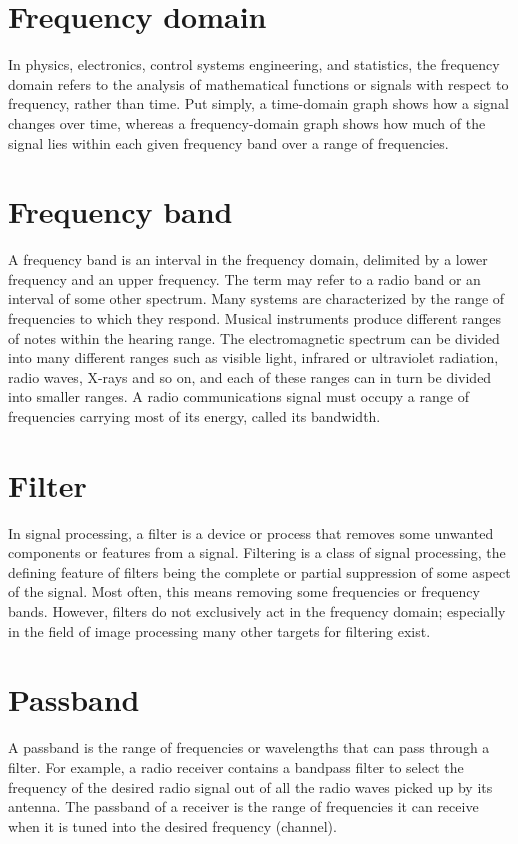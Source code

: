 \documentclass[journal,compsoc]{IEEEtran}
\begin{document}
\section{Frequency domain}
In physics, electronics, control systems engineering, and statistics, the frequency domain refers to the analysis of mathematical functions or signals with respect to frequency, rather than time. Put simply, a time-domain graph shows how a signal changes over time, whereas a frequency-domain graph shows how much of the signal lies within each given frequency band over a range of frequencies.

\section{Frequency band}
A frequency band is an interval in the frequency domain, delimited by a lower frequency and an upper frequency. The term may refer to a radio band or an interval of some other spectrum.
Many systems are characterized by the range of frequencies to which they respond. Musical instruments produce different ranges of notes within the hearing range. The electromagnetic spectrum can be divided into many different ranges such as visible light, infrared or ultraviolet radiation, radio waves, X-rays and so on, and each of these ranges can in turn be divided into smaller ranges. A radio communications signal must occupy a range of frequencies carrying most of its energy, called its bandwidth.

\section{Filter}
In signal processing, a filter is a device or process that removes some unwanted components or features from a signal. Filtering is a class of signal processing, the defining feature of filters being the complete or partial suppression of some aspect of the signal. Most often, this means removing some frequencies or frequency bands. However, filters do not exclusively act in the frequency domain; especially in the field of image processing many other targets for filtering exist.

\section{Passband}
A passband is the range of frequencies or wavelengths that can pass through a filter. For example, a radio receiver contains a bandpass filter to select the frequency of the desired radio signal out of all the radio waves picked up by its antenna. The passband of a receiver is the range of frequencies it can receive when it is tuned into the desired frequency (channel).
\end{document}
